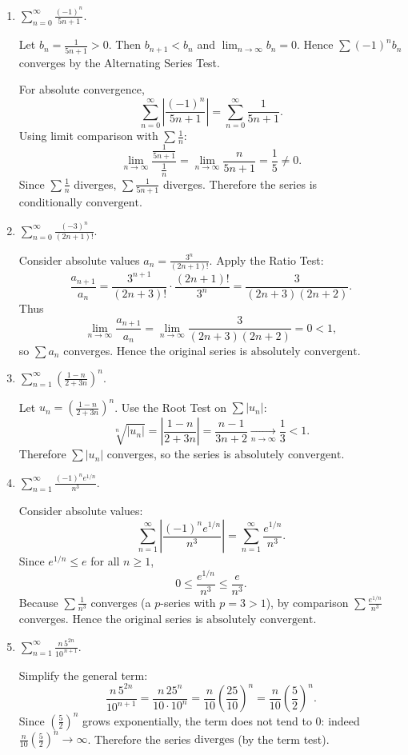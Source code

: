 \documentclass[12pt]{article}
\begin{document}
\begin{enumerate}[label=(\alph*)]
\item \(\displaystyle \sum_{n=0}^{\infty}\frac{(-1)^n}{5n+1}\).

Let \(b_n=\frac{1}{5n+1}>0\). Then \(b_{n+1}<b_n\) and \(\lim_{n\to\infty} b_n=0\).  
Hence \(\sum (-1)^n b_n\) converges by the Alternating Series Test.

For absolute convergence,
\[
\sum_{n=0}^{\infty}\left|\frac{(-1)^n}{5n+1}\right|
=\sum_{n=0}^{\infty}\frac{1}{5n+1}.
\]
Using limit comparison with \(\sum \frac{1}{n}\):
\[
\lim_{n\to\infty}\frac{\frac{1}{5n+1}}{\frac{1}{n}}
=\lim_{n\to\infty}\frac{n}{5n+1}=\frac{1}{5}\neq 0.
\]
Since \(\sum \frac{1}{n}\) diverges, \(\sum \frac{1}{5n+1}\) diverges.  
Therefore the series is \(\boxed{\text{conditionally convergent}}\).

\item \(\displaystyle \sum_{n=0}^{\infty}\frac{(-3)^n}{(2n+1)!}\).

Consider absolute values \(a_n=\frac{3^n}{(2n+1)!}\). Apply the Ratio Test:
\[
\frac{a_{n+1}}{a_n}
=\frac{3^{n+1}}{(2n+3)!}\cdot \frac{(2n+1)!}{3^n}
=\frac{3}{(2n+3)(2n+2)}.
\]
Thus
\[
\lim_{n\to\infty}\frac{a_{n+1}}{a_n}
=\lim_{n\to\infty}\frac{3}{(2n+3)(2n+2)}=0<1,
\]
so \(\sum a_n\) converges. Hence the original series is
\(\boxed{\text{absolutely convergent}}\).

\item \(\displaystyle \sum_{n=1}^{\infty}\left(\frac{1-n}{2+3n}\right)^{n}\).

Let \(u_n=\left(\frac{1-n}{2+3n}\right)^{n}\). Use the Root Test on \(\sum |u_n|\):
\[
\sqrt[n]{|u_n|}
=\left|\frac{1-n}{2+3n}\right|
=\frac{n-1}{3n+2}\xrightarrow[n\to\infty]{}\frac{1}{3}<1.
\]
Therefore \(\sum |u_n|\) converges, so the series is
\(\boxed{\text{absolutely convergent}}\).

\item \(\displaystyle \sum_{n=1}^{\infty}\frac{(-1)^n e^{1/n}}{n^{3}}\).

Consider absolute values:
\[
\sum_{n=1}^{\infty}\left|\frac{(-1)^n e^{1/n}}{n^{3}}\right|
=\sum_{n=1}^{\infty}\frac{e^{1/n}}{n^{3}}.
\]
Since \(e^{1/n}\le e\) for all \(n\ge 1\),
\[
0\le \frac{e^{1/n}}{n^3}\le \frac{e}{n^3}.
\]
Because \(\sum \frac{1}{n^3}\) converges (a \(p\)-series with \(p=3>1\)), by comparison
\(\sum \frac{e^{1/n}}{n^3}\) converges. Hence the original series is
\(\boxed{\text{absolutely convergent}}\).

\item \(\displaystyle \sum_{n=1}^{\infty}\frac{n\,5^{2n}}{10^{\,n+1}}\).

Simplify the general term:
\[
\frac{n\,5^{2n}}{10^{n+1}}
=\frac{n\,25^{n}}{10\cdot 10^{n}}
=\frac{n}{10}\left(\frac{25}{10}\right)^n
=\frac{n}{10}\left(\frac{5}{2}\right)^n.
\]
Since \(\left(\frac{5}{2}\right)^n\) grows exponentially, the term does not tend to \(0\):
indeed \(\frac{n}{10}\left(\frac{5}{2}\right)^n \to \infty\). Therefore the series
\(\boxed{\text{diverges}}\) (by the term test).
\end{enumerate}
\end{document}
